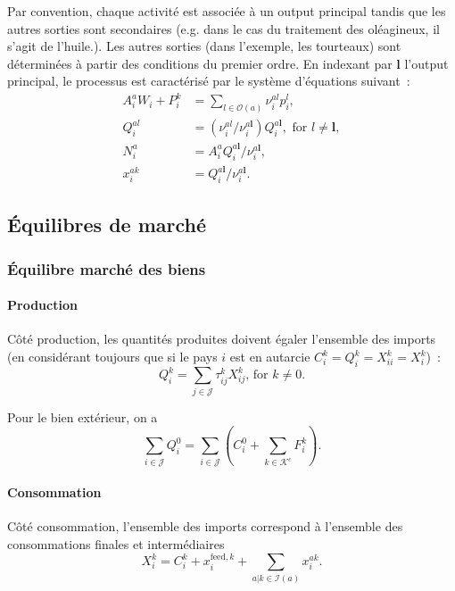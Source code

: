Par convention, chaque activité est associée à un output principal tandis que les autres sorties sont secondaires (e.g. dans le cas du traitement des oléagineux, il s’agit de l’huile.). Les autres sorties (dans l’exemple, les tourteaux) sont déterminées à partir des conditions du premier ordre. En indexant par $\mathbf{l}$ l’output principal, le processus est caractérisé par le système d’équations suivant~:
\begin{align}
    A_i^a W_i + P_i^k & = \sum_{l\in \mathcal{O}(a)} \nu_i^{al} p_i^{l},                                                      \\
    Q_i^{al}          & = \left( \nu_i^{al} / \nu_i^{a \mathbf{l}} \right)Q_i^{a \mathbf{l}}, \text{ for } l \neq \mathbf{l}, \\
    N_i^a             & = A_i^a Q_i^{a \mathbf{l}} / \nu_i^{a \mathbf{l}},                                                    \\
    x_i^{ak}          & = Q_i^{a \mathbf{l}} / \nu_i^{a \mathbf{l}}.
\end{align}

\subsection{Équilibres de marché}
\subsubsection{Équilibre marché des biens}
\paragraph{Production} Côté production, les quantités produites doivent égaler l’ensemble des imports (en considérant toujours que si le pays $i$ est en autarcie $C_i^k = Q_i^k = X_{ii}^k = X_i^k$)~:
\begin{equation}
    Q_i^k = \sum_{j \in \mathcal{J}} \tau_{ij}^k X_{ij}^k \text{, for } k \neq 0.
\end{equation}

Pour le bien extérieur, on a
\begin{equation}
    \sum_{i \in \mathcal{J}} Q_i^0 = \sum_{i \in \mathcal{J}} \left( C_i^0 + \sum_{k \in \mathcal{K}^c} F_i^k \right).
\end{equation}

\paragraph{Consommation} Côté consommation, l’ensemble des imports correspond à l’ensemble des consommations finales et intermédiaires
\begin{equation}
    X_i^k=C_i^k + x_i^{\text{feed},k} + \sum_{a | k \in \mathcal{I}(a)} x_i^{ak}.
\end{equation}

